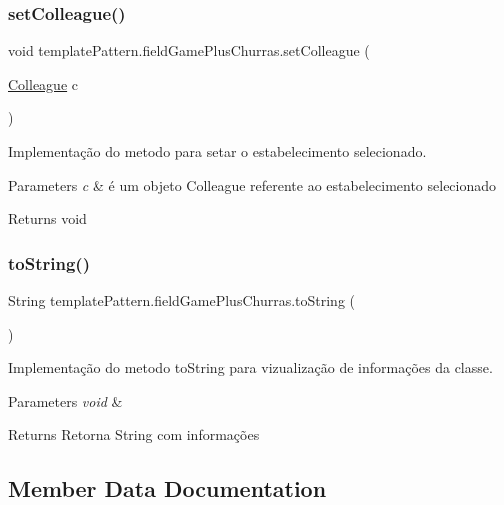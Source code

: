 \subsubsection{\texorpdfstring{setColleague()}{setColleague()}}
{\footnotesize\ttfamily void template\+Pattern.\+field\+Game\+Plus\+Churras.\+set\+Colleague (\begin{DoxyParamCaption}\item[{\mbox{\hyperlink{classmediator_pattern_1_1_colleague}{Colleague}}}]{c }\end{DoxyParamCaption})}



Implementação do metodo para setar o estabelecimento selecionado. 


\begin{DoxyParams}{Parameters}
{\em c} & é um objeto Colleague referente ao estabelecimento selecionado \\
\hline
\end{DoxyParams}
\begin{DoxyReturn}{Returns}
void 
\end{DoxyReturn}
\mbox{\label{classtemplate_pattern_1_1field_game_plus_churras_aaaad490a00572bfabb42b47cbe492940}} 
\subsubsection{\texorpdfstring{toString()}{toString()}}
{\footnotesize\ttfamily String template\+Pattern.\+field\+Game\+Plus\+Churras.\+to\+String (\begin{DoxyParamCaption}{ }\end{DoxyParamCaption})}



Implementação do metodo to\+String para vizualização de informações da classe. 


\begin{DoxyParams}{Parameters}
{\em void} & \\
\hline
\end{DoxyParams}
\begin{DoxyReturn}{Returns}
Retorna String com informações 
\end{DoxyReturn}


\subsection{Member Data Documentation}
\mbox{\label{classtemplate_pattern_1_1field_game_plus_churras_aa4ef4469e1c276d3169810331375a5e0}} 
